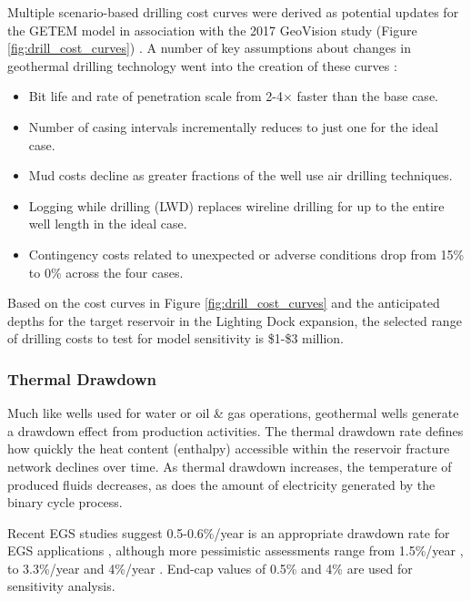 Multiple scenario-based drilling cost curves were derived as potential updates for the GETEM model in association with the 2017 GeoVision study (Figure \ref{fig:drill_cost_curves}) \citep{lowry_implications_2017}. A number of key assumptions about changes in geothermal drilling technology went into the creation of these curves \citep{augustine_geovision_2019}:

\begin{itemize}[itemsep=2pt]
    \item Bit life and rate of penetration scale from 2-4$\times$ faster than the base case.
    \item Number of casing intervals incrementally reduces to just one for the ideal case.
    \item Mud costs decline as greater fractions of the well use air drilling techniques.
    \item Logging while drilling (LWD) replaces wireline drilling for up to the entire well length in the ideal case.
    \item Contingency costs related to unexpected or adverse conditions drop from 15\% to 0\% across the four cases.
    
\end{itemize}
Based on the cost curves in Figure \ref{fig:drill_cost_curves} and the anticipated depths for the target reservoir in the Lighting Dock expansion, the selected range of drilling costs to test for model sensitivity is \$1-\$3 million.

\subsubsection{Thermal Drawdown}
\label{ch4:uncert_drawdown}

Much like wells used for water or oil \& gas operations, geothermal wells generate a drawdown effect from production activities. The thermal drawdown rate defines how quickly the heat content (enthalpy) accessible within the reservoir fracture network declines over time. As thermal drawdown increases, the temperature of produced fluids decreases, as does the amount of electricity generated by the binary cycle process.

Recent EGS studies suggest 0.5-0.6\%/year is an appropriate drawdown rate for EGS applications \citep{augustine_geovision_2019}, although more pessimistic assessments range from 1.5\%/year \citep{beckers_low-temperature_2016}, to 3.3\%/year \citep{augustine_comparison_2006} and 4\%/year \citep{tester_economic_1990}. End-cap values of 0.5\% and 4\% are used for sensitivity analysis.

